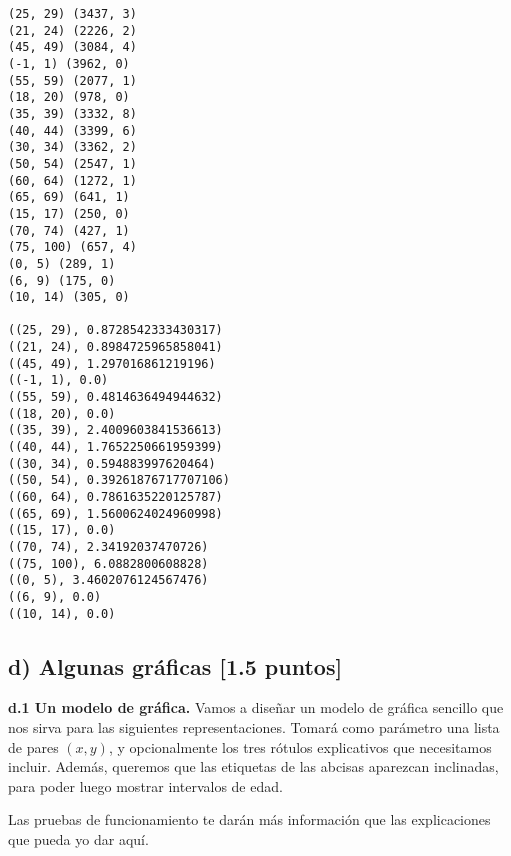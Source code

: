 \documentclass[11pt]{article}
\begin{document}
    \begin{Verbatim}[commandchars=\\\{\}]
(25, 29) (3437, 3)
(21, 24) (2226, 2)
(45, 49) (3084, 4)
(-1, 1) (3962, 0)
(55, 59) (2077, 1)
(18, 20) (978, 0)
(35, 39) (3332, 8)
(40, 44) (3399, 6)
(30, 34) (3362, 2)
(50, 54) (2547, 1)
(60, 64) (1272, 1)
(65, 69) (641, 1)
(15, 17) (250, 0)
(70, 74) (427, 1)
(75, 100) (657, 4)
(0, 5) (289, 1)
(6, 9) (175, 0)
(10, 14) (305, 0)

((25, 29), 0.8728542333430317)
((21, 24), 0.8984725965858041)
((45, 49), 1.297016861219196)
((-1, 1), 0.0)
((55, 59), 0.4814636494944632)
((18, 20), 0.0)
((35, 39), 2.4009603841536613)
((40, 44), 1.7652250661959399)
((30, 34), 0.594883997620464)
((50, 54), 0.39261876717707106)
((60, 64), 0.7861635220125787)
((65, 69), 1.5600624024960998)
((15, 17), 0.0)
((70, 74), 2.34192037470726)
((75, 100), 6.0882800608828)
((0, 5), 3.4602076124567476)
((6, 9), 0.0)
((10, 14), 0.0)
    \end{Verbatim}

    \hypertarget{d-algunas-gruxe1ficas-1.5-puntos}{%
\subsection{d) Algunas gráficas {[}1.5
puntos{]}}\label{d-algunas-gruxe1ficas-1.5-puntos}}

\textbf{d.1 Un modelo de gráfica.} Vamos a diseñar un modelo de gráfica
sencillo que nos sirva para las siguientes representaciones. Tomará como
parámetro una lista de pares \((x, y)\), y opcionalmente los tres
rótulos explicativos que necesitamos incluir. Además, queremos que las
etiquetas de las abcisas aparezcan inclinadas, para poder luego mostrar
intervalos de edad.

Las pruebas de funcionamiento te darán más información que las
explicaciones que pueda yo dar aquí.
\end{document}
